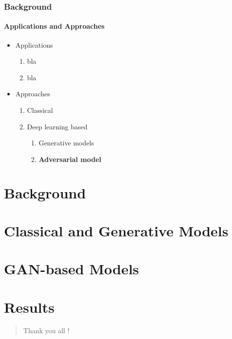 \documentclass{beamer}
\begin{document}
\begin{frame}
\frametitle{\textbf{Background}}
\framesubtitle{\textbf{Applications and Approaches}}
\begin{itemize}
  \item Applications
  
	\begin{enumerate}[$-$]
	\item  bla
	 \item bla
	\end{enumerate}
	
	\item Approaches
  
	\begin{enumerate}[$-$]
	\item Classical
	\item Deep learning based
	\begin{enumerate}[$-$]
	  \item Generative models
	  \item \textbf{Adversarial model}
	\end{enumerate}	 
	\end{enumerate}
	
\end{itemize}
\end{frame}


\section*{Background}

\section*{Classical and Generative Models}

\section*{GAN-based Models}

\section*{Results}



\begin{frame}
\begin{quote}
\begin{center}
\huge{Thank you all !} \\

\end{center}   
\end{quote}
\end{frame}
\end{document}
